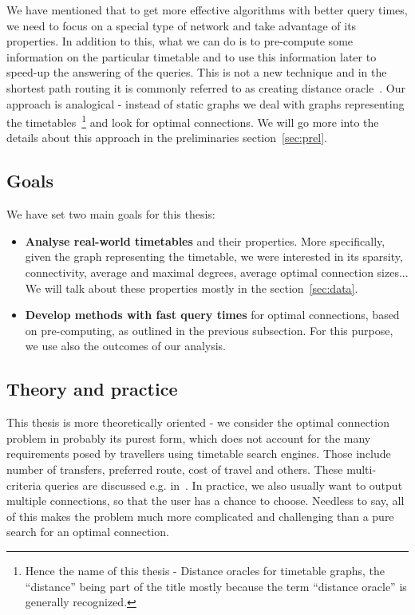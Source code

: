	\noindent We have mentioned that to get more effective algorithms with better query times, we need to focus on a special type of network and take advantage of its properties. In addition to this, what we can do is to pre-compute some information on the particular timetable and to use this information later to speed-up the answering of the queries. This is not a new technique and in the shortest path routing it is commonly referred to as creating distance oracle~\cite{apxdo05}. Our approach is analogical - instead of static graphs we deal with graphs representing the timetables~\footnote{Hence the name of this thesis - Distance oracles for timetable graphs, the ``distance'' being part of the title mostly because the term ``distance oracle'' is generally recognized.} and look for optimal connections. We will go more into the details about this approach in the preliminaries section~\ref{sec:prel}.
	
\subsection{Goals}
	
	\noindent We have set two main goals for this thesis:
	\begin{itemize}
		\item \textbf{Analyse real-world timetables} and their properties. More specifically, given the graph representing the timetable, we were interested in its sparsity, connectivity, average and maximal degrees, average optimal connection sizes... We will talk about these properties mostly in the section~\ref{sec:data}. 
		\item \textbf{Develop methods with fast query times} for optimal connections, based on pre-computing, as outlined in the previous subsection. For this purpose, we use also the outcomes of our analysis.
	\end{itemize}
	
\subsection{Theory and practice}

	\noindent This thesis is more theoretically oriented - we consider the optimal connection problem in probably its purest form, which does not account for the many requirements posed by travellers using timetable search engines. Those include number of transfers, preferred route, cost of travel and others. These multi-criteria queries are discussed e.g. in~\cite{timetablemodelsalgs07}. In practice, we also usually want to output multiple connections, so that the user has a chance to choose. Needless to say, all of this makes the problem much more complicated and challenging than a pure search for an optimal connection.
	
